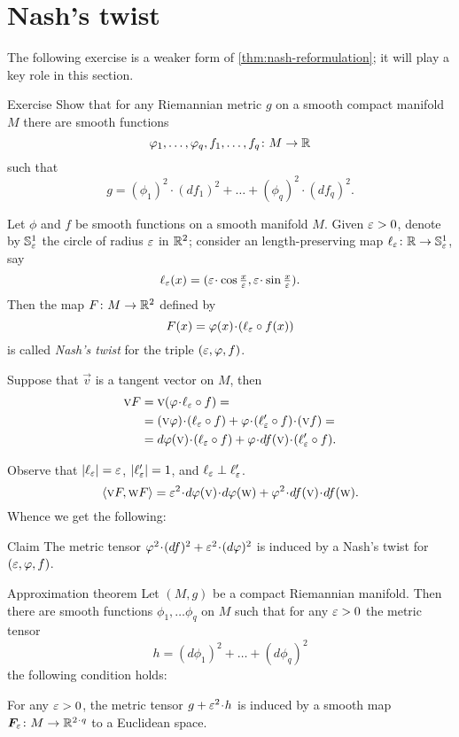 \section{Nash's twist}

The following exercise is a weaker form of \ref{thm:nash-reformulation}; it will play a key role in this section.

\begin{thm}{Exercise}\label{ex:nash}
Show that for any Riemannian metric $g$ on a smooth compact manifold $M$ there are smooth functions 
\[\varphi_1,\dots,\varphi_q,f_1,\dots,f_q\colon M\to\mathbb{R}\]
such that 
\[g=(\phi_1)^2 \cdot (df_1)^2+\dots+(\phi_q)^2\cdot (df_q)^2.\]

\end{thm}

Let $\phi$ and $f$ be smooth functions on a smooth manifold $M$.
Given $\varepsilon>0$, denote by $\mathbb{S}^1_\varepsilon$ the circle of radius $\varepsilon$ in $\mathbb{R}^2$;
consider an length-preserving map $\ell_\varepsilon\colon\mathbb{R}\to\mathbb{S}^1_\varepsilon$, say 
\[\ell_\eps(x)=(\eps\cdot\cos\tfrac x\eps,\eps\cdot\sin\tfrac x\eps).\]
Then the map $F\colon M\to \mathbb{R}^2$ defined by
\[F(x)=\phi(x)\cdot (\ell_\eps\circ f(x))\]
is called \emph{Nash's twist} for the triple $(\varepsilon,\varphi,f)$.

Suppose that $\vec v$ is a tangent vector on $M$, then
\begin{align*}
\vec vF&=\vec v(\phi\cdot \ell_\eps\circ f)=
\\
&=(\vec v\phi)\cdot(\ell_\eps\circ f) + \phi\cdot (\ell_\eps'\circ f)\cdot(\vec vf)=
\\
&=d\phi(\vec v)\cdot (\ell_\eps\circ f)+\phi\cdot df(\vec v)\cdot (\ell_\eps'\circ f).
\end{align*}

Observe that $|\ell_\varepsilon|=\varepsilon$, $|\ell'_\varepsilon|=1$, and $\ell_\varepsilon\perp \ell'_\varepsilon$.
\[\langle \vec vF,\vec wF\rangle =\eps^2\cdot d\phi(\vec v)\cdot d\phi(\vec w)+\phi^2\cdot df(\vec v)\cdot df(\vec w).\]
Whence we get the following:

\begin{thm}{Claim}\label{clm:twist}
The metric tensor $\phi^2\cdot (df)^2+\eps^2\cdot(d\phi)^2$
is induced by a Nash's twist for $(\varepsilon,\varphi,f)$.

\end{thm}


\begin{thm}{Approximation theorem}\label{thm:approx}
Let $(M,g)$ be a compact Riemannian manifold.
Then there are smooth functions $\phi_1,\dots \phi_q$ on $M$ such that 
for any $\varepsilon>0$ the metric tensor 
\[h=(d\phi_1)^2+\dots+(d\phi_q)^2\]
the following condition holds:

For any $\varepsilon>0$, the metric tensor $g+\eps^2\cdot h$ is induced by a smooth map $\bm{F}_\eps\:M\to \RR^{2\cdot q}$ to a Euclidean space.
\end{thm}

